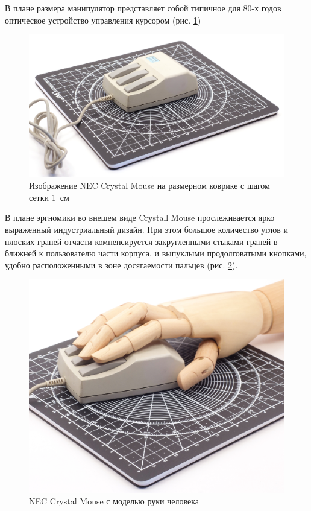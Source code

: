 \documentclass[11pt, a4paper]{article}
\begin{document}
В плане размера манипулятор представляет собой типичное для 80-х годов оптическое устройство управления курсором (рис. \ref{fig:NecCrystalSize})

\begin{figure}[h]
    \centering
    \includegraphics[scale=0.4]{1986_nec_crystal_mouse/NecKovrik_60.jpg}
    \caption{Изображение NEC Crystal Mouse на размерном коврике с шагом сетки 1~см}
    \label{fig:NecCrystalSize}
\end{figure}

В плане эргномики во внешем виде Crystall Mouse прослеживается ярко выраженный индустриальный дизайн. При этом большое количество углов и плоских граней отчасти компенсируется закругленными стыками граней в ближней к пользователю части корпуса, и выпуклыми продолговатыми кнопками, удобно расположенными в зоне досягаемости пальцев (рис. \ref{fig:NecCrystalHand}).

\begin{figure}[h]
    \centering
    \includegraphics[scale=0.4]{1986_nec_crystal_mouse/NecRuka_30.jpg}
    \caption{NEC Crystal Mouse с моделью руки человека}
    \label{fig:NecCrystalHand}
\end{figure}
\end{document}
